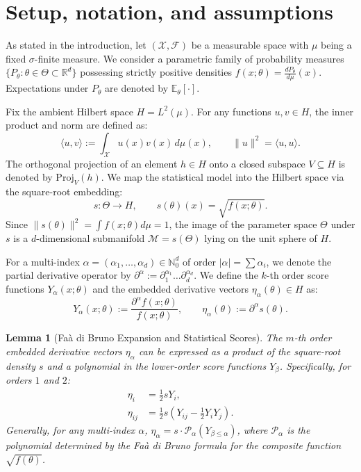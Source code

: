 \documentclass[pdflatex,sn-mathphys-num]{sn-jnl}%
\newcommand{\ip}[2]{\langle #1,#2\rangle}
\theoremstyle{thmstyleone}%
\theoremstyle{thmstyletwo}%
\theoremstyle{thmstylethree}%
\newtheorem{lemma}[theorem]{Lemma}
\begin{document}
\section{Setup, notation, and assumptions}\label{sec:assumptions}

As stated in the introduction, let $(\mathcal X,\mathcal F)$ be a measurable space with $\mu$ being a fixed $\sigma$-finite measure. We consider a parametric family of probability measures $\{P_\theta:\theta\in\Theta\subset\mathbb{R}^d\}$ possessing strictly positive densities $f(x;\theta) = \frac{dP_\theta}{d\mu}(x)$. Expectations under $P_\theta$ are denoted by $\mathbb{E}_\theta[\cdot]$.

Fix the ambient Hilbert space \(H = L^2(\mu)\). For any functions $u, v \in H$, the inner product and norm are defined as:
\[
\ip{u}{v} := \int_{\mathcal{X}} u(x)v(x)\,d\mu(x), \qquad \|u\|^2 = \ip{u}{u}.
\]
The orthogonal projection of an element $h \in H$ onto a closed subspace \(V \subseteq H\) is denoted by $\mathrm{Proj}_V(h)$. We map the statistical model into the Hilbert space via the square-root embedding:
\[
s: \Theta \to H, \qquad s(\theta)(x) = \sqrt{f(x;\theta)}.
\]
Since $\|s(\theta)\|^2 = \int f(x;\theta) d\mu = 1$, the image of the parameter space $\Theta$ under $s$ is a $d$-dimensional submanifold $\mathcal{M} = s(\Theta)$ lying on the unit sphere of $H$.

For a multi-index $\alpha = (\alpha_1, \dots, \alpha_d) \in \mathbb{N}_0^d$ of order $|\alpha| = \sum \alpha_i$, we denote the partial derivative operator by $\partial^\alpha := \partial_1^{\alpha_1} \dots \partial_d^{\alpha_d}$. We define the $k$-th order score functions $Y_\alpha(x;\theta)$ and the embedded derivative vectors $\eta_\alpha(\theta) \in H$ as:
\[
Y_\alpha(x;\theta) := \frac{\partial^\alpha f(x;\theta)}{f(x;\theta)}, \qquad \eta_\alpha(\theta) := \partial^\alpha s(\theta).
\]
\begin{lemma}[Fa\`a di Bruno Expansion and Statistical Scores]
\label{lem:faa_di_bruno}
The $m$-th order embedded derivative vectors $\eta_\alpha$ can be expressed as a product of the square-root density $s$ and a polynomial in the lower-order score functions $Y_\beta$. Specifically, for orders $1$ and $2$:
\begin{align}
\eta_i &= \frac{1}{2} s Y_i, \label{eq:eta1}\\
\eta_{ij} &= \frac{1}{2} s \left( Y_{ij} - \frac{1}{2} Y_i Y_j \right). \label{eq:eta2}
\end{align}
Generally, for any multi-index $\alpha$, $\eta_\alpha = s \cdot \mathcal{P}_\alpha(Y_{\beta \le \alpha})$, where $\mathcal{P}_\alpha$ is the polynomial determined by the Fa\`a di Bruno formula for the composite function $\sqrt{f(\theta)}$.
\end{lemma}
\end{document}
